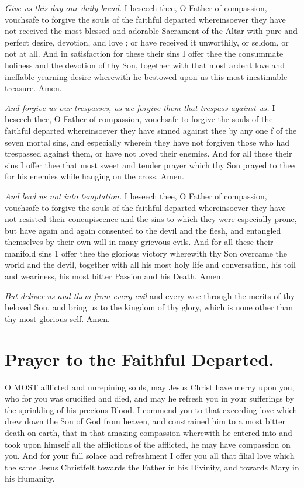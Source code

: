 \documentclass[a5paper,12pt]{memoir}
\begin{document}
\emph{Give us this day 
onr daily bread.} I 
beseech thee, O Father of compassion, 
vouchsafe to forgive 
the souls of the faithful departed whereinsoever they have not 
received the most 
blessed and adorable 
Sacrament of the Altar with pure and perfect desire, devotion, 
and love ; or have received it unworthily, 
or seldom, or not at 
all. And in satisfaction for these their sins 
I offer thee the consummate holiness and 
the devotion of thy 
Son, together with 
that most ardent love 
and ineffable yearning desire wherewith 
he bestowed upon us 
this most inestimable 
treasure. Amen. 

\emph{And forgive us our 
trespasses, as we forgive them that trespass 
against us.} I beseech 
thee, O Father of compassion, vouchsafe to 
forgive the souls of 
the faithful departed 
whereinsoever they 
have sinned against 
thee by any one f of 
the seven mortal sins, 
and especially wherein they have not forgiven those who had 
trespassed against 
them, or have not 
loved their enemies. 
And for all these their 
sins I offer thee that 
most sweet and tender 
prayer which thy Son 
prayed to thee for his 
enemies while hanging on the cross. Amen. 

\emph{And lead us not into 
temptation.} I beseech thee, O Father 
of compassion, vouchsafe to forgive the 
souls of the faithful 
departed whereinsoever they have not resisted their concupiscence and the sins to 
which they were especially prone, but have 
again and again consented to the devil 
and the flesh, and entangled themselves by 
their own will in many 
grievous evils. And 
for all these their manifold sins 1 offer thee 
the glorious victory 
wherewith thy Son 
overcame the world 
and the devil, together with all his most 
holy life and conversation, his toil and 
weariness, his most 
bitter Passion and his 
Death. Amen. 

\emph{But deliver us and 
them from every evil} 
and every woe through 
the merits of thy beloved Son, and bring 
us to the kingdom of 
thy glory, which is 
none other than thy 
most glorious self. Amen. 


\section{Prayer to the Faithful Departed.}

O MOST afflicted 
and unrepining 
souls, may Jesus Christ 
have mercy upon you, 
who for you was crucified and died, and 
may he refresh you in 
your sufferings by the 
sprinkling of his precious Blood. I commend you to that exceeding love which 
drew down the Son of 
God from heaven, and 
constrained him to a 
most bitter death on 
earth, that in that 
amazing compassion 
wherewith he entered 
into and took upon 
himself all the afflictions of the afflicted, 
he may have compassion on you. And for 
your full solace and 
refreshment I offer 
you all that filial love 
which the same Jesus 
Christfelt towards the 
Father in his Divinity, and towards Mary 
in his Humanity. 
\end{document}
